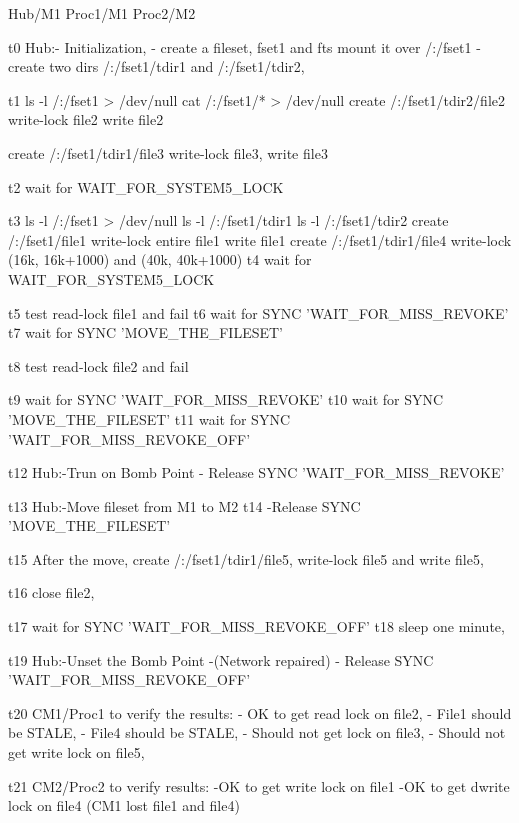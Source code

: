 \begin{programexample}

    Hub/M1		Proc1/M1			Proc2/M2
	 	 
t0  Hub:- Initialization,
	- create a fileset, fset1 and fts mount it over /:/fset1
	- create two dirs /:/fset1/tdir1 and /:/fset1/tdir2, 

t1							ls -l /:/fset1  > /dev/null
							cat /:/fset1/* > /dev/null
							create /:/fset1/tdir2/file2
							write-lock file2
							write file2

							create /:/fset1/tdir1/file3
							write-lock file3,
							write file3

t2							wait for WAIT_FOR_SYSTEM5_LOCK


t3			ls -l /:/fset1 > /dev/null
			ls -l /:/fset1/tdir1
			ls -l /:/fset1/tdir2
			create /:/fset1/file1
			write-lock entire file1
			write file1
			create /:/fset1/tdir1/file4
			write-lock (16k, 16k+1000) and (40k, 40k+1000)
t4			wait for WAIT_FOR_SYSTEM5_LOCK


t5							test read-lock file1 and fail
t6							wait for SYNC 'WAIT_FOR_MISS_REVOKE'
t7							wait for SYNC 'MOVE_THE_FILESET'


t8			test read-lock file2 and fail
			
t9			wait for SYNC 'WAIT_FOR_MISS_REVOKE'
t10			wait for SYNC 'MOVE_THE_FILESET'
t11			wait for SYNC 'WAIT_FOR_MISS_REVOKE_OFF'

t12  Hub:-Trun on Bomb Point
	- Release SYNC 'WAIT_FOR_MISS_REVOKE'

t13 Hub:-Move fileset from M1 to M2
t14	-Release SYNC 'MOVE_THE_FILESET'

t15							After the move, 
							create /:/fset1/tdir1/file5,
							write-lock file5 and write file5,

t16							close file2,
				
t17							wait for SYNC 'WAIT_FOR_MISS_REVOKE_OFF'
t18							sleep one minute,

t19 Hub:-Unset the Bomb Point 
	-(Network repaired)
	- Release SYNC 'WAIT_FOR_MISS_REVOKE_OFF'

t20		        CM1/Proc1 to verify the results:
			- OK to get read lock on file2,
			- File1 should be STALE,
			- File4 should be STALE,
			- Should not get lock on file3,
			- Should not get write lock on file5,


t21							CM2/Proc2 to verify results:
							-OK to get write lock on file1
							-OK to get dwrite lock on file4
							(CM1 lost file1 and file4)


\end{programexample}
   
